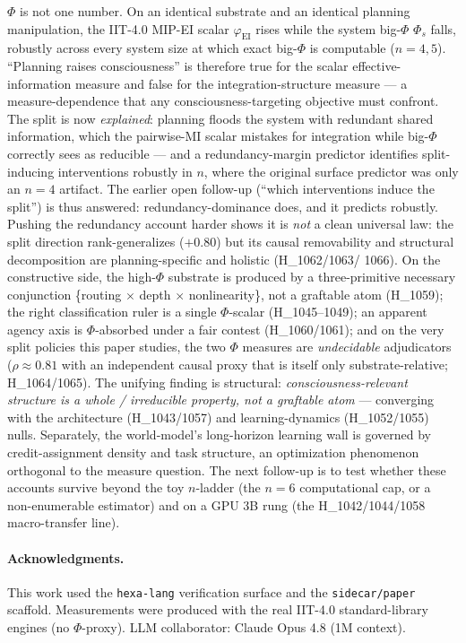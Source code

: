 \documentclass[11pt,a4paper]{article}
\newcommand{\faithful}{\ensuremath{\varphi_{\mathrm{EI}}}}
\newcommand{\bigphi}{\ensuremath{\Phi_{s}}}
\begin{document}
$\Phi$ is not one number. On an identical substrate and an identical planning
manipulation, the IIT-4.0 MIP-EI scalar \faithful{} rises while the system
big-$\Phi$ \bigphi{} falls, robustly across every system size at which exact
big-$\Phi$ is computable ($n=4,5$). ``Planning raises consciousness'' is
therefore true for the scalar effective-information measure and false for the
integration-structure measure --- a measure-dependence that any
consciousness-targeting objective must confront. The split is now
\emph{explained}: planning floods the system with redundant shared information,
which the pairwise-MI scalar mistakes for integration while big-$\Phi$ correctly
sees as reducible --- and a redundancy-margin predictor identifies split-inducing
interventions robustly in $n$, where the original surface predictor was only an
$n=4$ artifact. The earlier open follow-up (``which interventions induce the
split'') is thus answered: redundancy-dominance does, and it predicts robustly.
Pushing the redundancy account harder shows it is \emph{not} a clean universal
law: the split direction rank-generalizes ($+0.80$) but its causal removability
and structural decomposition are planning-specific and holistic (H\_1062/1063/%
1066). On the constructive side, the high-$\Phi$ substrate is produced by a
three-primitive necessary conjunction \{routing $\times$ depth $\times$
nonlinearity\}, not a graftable atom (H\_1059); the right classification ruler is
a single $\Phi$-scalar (H\_1045--1049); an apparent agency axis is $\Phi$-absorbed
under a fair contest (H\_1060/1061); and on the very split policies this paper
studies, the two $\Phi$ measures are \emph{undecidable} adjudicators
($\rho\approx0.81$ with an independent causal proxy that is itself only
substrate-relative; H\_1064/1065). The unifying finding is structural:
\emph{consciousness-relevant structure is a whole / irreducible property, not a
graftable atom} --- converging with the architecture (H\_1043/1057) and
learning-dynamics (H\_1052/1055) nulls. Separately, the world-model's
long-horizon learning wall is governed by credit-assignment density and task
structure, an optimization phenomenon orthogonal to the measure question. The
next follow-up is to test whether these accounts survive beyond the toy
$n$-ladder (the $n=6$ computational cap, or a non-enumerable estimator) and on a
GPU 3B rung (the H\_1042/1044/1058 macro-transfer line).

\paragraph{Acknowledgments.}
This work used the \texttt{hexa-lang} verification surface and the
\texttt{sidecar/paper} scaffold. Measurements were produced with the
real IIT-4.0 standard-library engines (no $\Phi$-proxy). LLM collaborator:
Claude Opus 4.8 (1M context).
\end{document}
